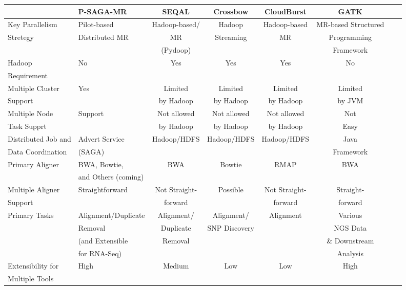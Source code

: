 \documentclass{acm_proc_article-sp}
\begin{document}
\begin{center}
\begin{table}[ht]
{\small
\hfill{}
\begin{tabular}{|l|l|c|c|c|c|c|c|}
\hline
  & \textbf{P-SAGA-MR}\cite{pmr2012} & \textbf{SEQAL}\cite{seal2011} & \textbf{Crossbow}\cite{langmead2009} & \textbf{CloudBurst}\cite{cloudburst} & \textbf{GATK}\cite{gatk} \\ \hline
 \hline 
Key Parallelism   & Pilot-based   &  Hadoop-based/  &  Hadoop   & Hadoop-based & MR-based Structured \\ 
Stretegy  & Distributed MR & MR  & Streaming  & MR & Programming  \\
& & (Pydoop) &  & & Framework  \\ \hline
  
Hadoop & No & Yes & Yes\footnote[1] & Yes & No \\ 
Requirement  & & & &  &\\ \hline  
    
Multiple  Cluster & Yes  & Limited   & Limited  & Limited  & Limited \\
Support &  & by Hadoop &  by Hadoop & by Hadoop  & by JVM   \\ \hline

Multiple Node & Support & Not allowed  & Not allowed  & Not allowed & Not  \\
Task Supprt &  & by Hadoop & by Hadoop & by Hadoop & Easy  \\ \hline
Distributed Job and  & Advert Service  & Hadoop/HDFS & Hadoop/HDFS & Hadoop/HDFS & Java \\ 
Data Coordination &(SAGA) &  & & & Framework\\ \hline


Primary Aligner &  BWA, Bowtie,  &  BWA & Bowtie & RMAP &  BWA \\
& and Others (coming) &  &  &  &  \\ \hline
Multiple Aligner  & Straightforward & Not Straight- & Possible & Not Straight-  & Straight-  \\ 
Support &  & forward &   & forward  & forward \\\hline
Primary Tasks & Alignment/Duplicate  & Alignment/ & Alignment/ & Alignment &Various\\
  &  Removal & Duplicate & SNP Discovery & & NGS Data  \\  
           & (and Extensible &  Removal & &  & \& Downstream  \\
           & for RNA-Seq) & & &  & Analysis \\ \hline  
Extensibility for   &  High  & Medium &  Low & Low & High      \\
Multiple Tools  &      &  &  &  &   \\ \hline


\end{tabular}}
\end{table}
\end{center}
\end{document}
